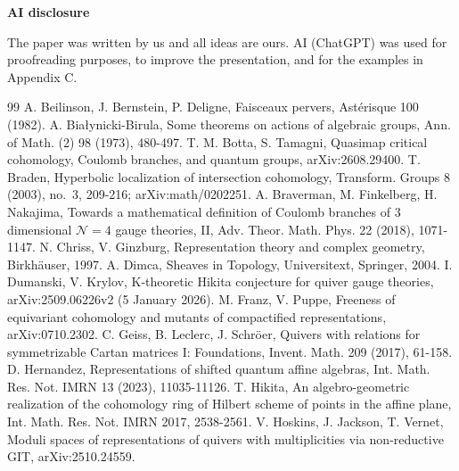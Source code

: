 \documentclass[11pt,reqno]{amsart}
\theoremstyle{definition}
\theoremstyle{remark}
\begin{document}
\medskip

\centerline{\textbf{AI disclosure}}

\smallskip

The paper was written by us and all ideas are ours. AI (ChatGPT) 
was used for proofreading purposes, to improve the presentation, and for the examples in Appendix C.

\medskip

















\begin{thebibliography}{99}
 A. Beilinson, J. Bernstein, P. Deligne, Faisceaux pervers, Ast\'erisque 100 (1982).
 A. Bia\l ynicki-Birula, Some theorems on actions of algebraic groups,
Ann. of Math. (2) 98 (1973), 480-497.
 T. M. Botta, S. Tamagni, Quasimap critical cohomology, Coulomb branches, and quantum groups, arXiv:2608.29400.
 T. Braden, Hyperbolic localization of intersection cohomology,
Transform. Groups 8 (2003), no.~3, 209-216; arXiv:math/0202251.
 A. Braverman, M. Finkelberg, H. Nakajima, Towards a mathematical definition of Coulomb branches of $3$ dimensional $\mathcal N=4$
gauge theories, II, Adv. Theor. Math. Phys. 22 (2018), 1071-1147.
 N. Chriss, V. Ginzburg, Representation theory and complex geometry, Birkh\"auser, 1997.
 A. Dimca, Sheaves in Topology, Universitext, Springer, 2004.
 I. Dumanski, V. Krylov, K-theoretic Hikita conjecture for quiver gauge theories, arXiv:2509.06226v2 (5 January 2026).
 M. Franz, V. Puppe, Freeness of equivariant cohomology and mutants of compactified representations, arXiv:0710.2302.
 C. Geiss, B. Leclerc, J. Schr\"oer, Quivers with relations for symmetrizable Cartan matrices I: Foundations, Invent. Math. 209
(2017), 61-158.
 D. Hernandez, Representations of shifted quantum affine algebras, Int. Math. Res. Not. IMRN 13 (2023), 11035-11126.
 T. Hikita, An algebro-geometric realization of the cohomology ring of Hilbert scheme of points in the affine plane, Int. Math.
Res. Not. IMRN 2017, 2538-2561.
 V. Hoskins, J. Jackson, T. Vernet, Moduli spaces of representations of quivers with multiplicities via non-reductive GIT, arXiv:2510.24559.

\end{thebibliography}
\end{document}
